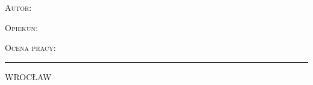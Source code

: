 \begin{center}
	\begin{flushright}
		\begin{minipage}[t]{10cm}
			\begin{flushleft}
				\begin{large}
					\vspace{0.3cm}
					\begin{large}
						\textsc{Autor:}\newline
						\autor\newline
					\end{large}
					
					\vspace{1.5cm}
					\textsc{Opiekun:}\newline
					\opiekun\newline
					
					\vspace{0.5cm}
					\textsc{Ocena pracy:}\newline
				\end{large}
			\end{flushleft}
		\end{minipage}
	\end{flushright}
	\vfill
	\rule[-0.3ex]{\textwidth}{1pt}
	WROCŁAW \rok
\end{center}
\newpage
\clearpage
\enlargethispage{-3cm}
\addtolength{\textheight}{-1.8cm}
\addtolength{\textwidth}{-0.2cm}
\addtolength{\topmargin}{2.2cm}

